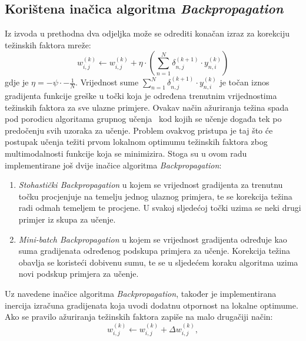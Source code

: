 \subsection{Korištena inačica algoritma \emph{Backpropagation}}
\label{subsec:koristena-inacica-algoritmaemph}
Iz izvoda u prethodna dva odjeljka može se odrediti konačan izraz za korekciju težinskih faktora mreže:\\
\begin{equation}
    w_{i, j}^{(k)} \leftarrow w_{i, j}^{(k)} + \eta \cdot \left(\sum_{n = 1}^{N} \delta_{n, j}^{(k + 1)}
    \cdot y_{n, i}^{(k)}\right)\label{eq:w-correction-final}
\end{equation}
gdje je $\eta = -\psi \cdot -\frac{1}{N}$. Vrijednost sume
$\sum_{n = 1}^{N} \delta_{n, j}^{(k + 1)} \cdot y_{n, i}^{(k)}$ je točan iznos gradijenta funkcije greške u točki koja
je određena trenutnim vrijednostima težinskih faktora za sve ulazne primjere. Ovakav način ažuriranja težina spada pod
porodicu algoritama grupnog učenja\ \citep{cupic2013} kod kojih se učenje događa tek po predočenju svih uzoraka za
učenje. Problem ovakvog pristupa je taj što će postupak učenja težiti prvom lokalnom optimumu težinskih faktora zbog
multimodalnosti funkcije koja se minimizira. Stoga su u ovom radu implementirane još dvije inačice algoritma
\emph{Backpropagation}:
\begin{enumerate}
    \item \emph{Stohastički Backpropagation} u kojem se vrijednost gradijenta za trenutnu točku procjenjuje na temelju
    jednog ulaznog primjera, te se korekcija težina radi odmah temeljem te procjene. U svakoj sljedećoj točki uzima se
    neki drugi primjer iz skupa za učenje.
    \item \emph{Mini-batch Backpropagation} u kojem se vrijednost gradijenta određuje kao suma gradijenata određenog
    podskupa primjera za učenje. Korekcija težina obavlja se koristeći dobivenu sumu, te se u sljedećem koraku algoritma
    uzima novi podskup primjera za učenje.
\end{enumerate}
Uz navedene inačice algoritma \emph{Backpropagation}, također je implementirana inercija izračuna gradijenata koja uvodi
dodatnu otpornost na lokalne optimume. Ako se pravilo ažuriranja težinskih faktora zapiše na malo drugačiji način:\\
\begin{equation}
    w_{i, j}^{(k)} \leftarrow w_{i, j}^{(k)} + \Delta w_{i, j}^{(k)},\label{eq:w-correction-alt}
\end{equation}\\
